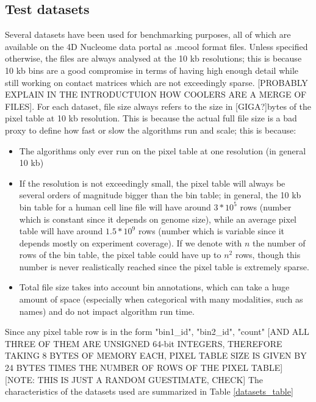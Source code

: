 \subsection{Test datasets}
Several datasets have been used for benchmarking purposes, all of which are available on the 4D Nucleome data portal \cite{4dn2022} as .mcool format files. Unless specified otherwise, the files are always analysed at the 10 kb resolutions; this is because 10 kb bins are a good compromise in terms of having high enough detail while still working on contact matrices which are not exceedingly sparse. [PROBABLY EXPLAIN IN THE INTRODUCTUION HOW COOLERS ARE A MERGE OF FILES]. 
For each dataset, file size always refers to the size in [GIGA?]bytes of the pixel table at 10 kb resolution. This is because the actual full file size is a bad proxy to define how fast or slow the algorithms run and scale; this is because: 
\begin{itemize}\tightlist
  \item The algorithms only ever run on the pixel table at one resolution (in general 10 kb)
  \item If the resolution is not exceedingly small, the pixel table will always be several orders of magnitude bigger than the bin table; in general, the 10 kb bin table for a human cell line file will have around $3 * 10^5$ rows (number which is constant since it depends on genome size), while an average pixel table will have around $1.5 * 10^9$ rows (number which is variable since it depends mostly on experiment coverage). If we denote with $n$ the number of rows of the bin table, the pixel table could have up to $n^2$ rows, though this number is never realistically reached since the pixel table is extremely sparse.
  \item Total file size takes into account bin annotations, which can take a huge amount of space (especially when categorical with many modalities, such as names) and do not impact algorithm run time.
\end{itemize}
Since any pixel table row is in the form "bin1\_id", "bin2\_id", "count" [AND ALL THREE OF THEM ARE UNSIGNED 64-bit INTEGERS, THEREFORE TAKING 8 BYTES OF MEMORY EACH, PIXEL TABLE SIZE IS GIVEN BY 24 BYTES TIMES THE NUMBER OF ROWS OF THE PIXEL TABLE][NOTE: THIS IS JUST A RANDOM GUESTIMATE, CHECK]
The characteristics of the datasets used are summarized in Table \ref{datasets_table}

